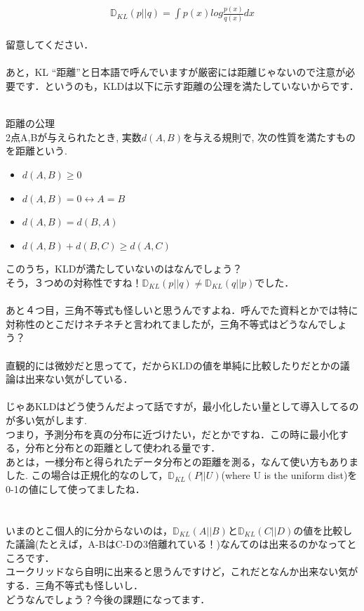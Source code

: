 \documentclass[11pt,a4paper,uplatex]{ujreport}
\begin{document}
\begin{eqnarray}
\label{eq:KLD-inv}
  \mathbb{D}_{KL}(p||q) =  \int p(x) log \frac{p(x)}{q(x)} dx
\end{eqnarray}
\\
留意してください．\\
\\
あと，KL ``距離''と日本語で呼んでいますが厳密には距離じゃないので注意が必要です．というのも，KLDは以下に示す距離の公理\cite{distance}を満たしていないからです．\\
\\

\begin{screen}
距離の公理\\
2点A,Bが与えられたとき, 実数$d(A,B)$を与える規則で, 次の性質を満たすものを距離という.
\begin{itemize}
\item{$d(A, B) \geq 0$}
\item{$d(A, B) = 0 \leftrightarrow A=B$}
\item{$d(A, B) = d(B, A)$}
\item{$d(A, B) + d(B, C) \geq d(A, C)$}
\end{itemize}
\end{screen}

このうち，KLDが満たしていないのはなんでしょう？\\
そう，３つめの対称性ですね！$\mathbb{D}_{KL}(p||q) \neq \mathbb{D}_{KL}(q||p)$でした．\\
\\
あと４つ目，三角不等式も怪しいと思うんですよね．呼んでた資料とかでは特に対称性のとこだけネチネチと言われてましたが，三角不等式はどうなんでしょう？\\
\\
直観的には微妙だと思ってて，だからKLDの値を単純に比較したりだとかの議論は出来ない気がしている．\\
\\
じゃあKLDはどう使うんだよって話ですが，最小化したい量として導入してるのが多い気がします.\\
つまり，予測分布を真の分布に近づけたい，だとかですね．この時に最小化する，分布と分布との距離として使われる量です．\\
あとは，一様分布と得られたデータ分布との距離を測る，なんて使い方もありました\cite{tort}. この場合は正規化的なのして，$\mathbb{D}_{KL}(P||U)$(where U is the uniform dist)を0-1の値にして使ってましたね．\\
\\
\\
いまのとこ個人的に分からないのは，$\mathbb{D}_{KL}(A||B)$と$\mathbb{D}_{KL}(C||D)$の値を比較した議論(たとえば，A-BはC-Dの3倍離れている！)なんてのは出来るのかなってところです．\\
ユークリッドなら自明に出来ると思うんですけど，これだとなんか出来ない気がする．三角不等式も怪しいし．\\
どうなんでしょう？今後の課題になってます．\\
\\
\end{document}
